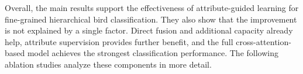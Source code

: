 Overall, the main results support the effectiveness of attribute-guided learning for fine-grained hierarchical bird classification. They also show that the improvement is not explained by a single factor. Direct fusion and additional capacity already help, attribute supervision provides further benefit, and the full cross-attention-based model achieves the strongest classification performance. The following ablation studies analyze these components in more detail.







